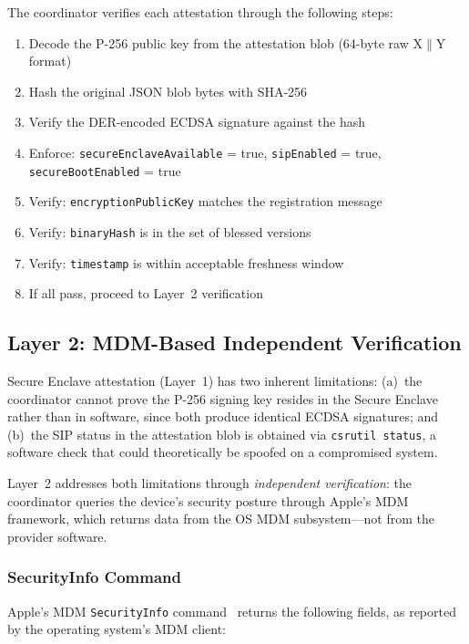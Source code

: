 \documentclass[10pt,twocolumn,letterpaper]{article}
\begin{document}
The coordinator verifies each attestation through the following steps:
\begin{enumerate}[leftmargin=*,itemsep=1pt]
    \item Decode the P-256 public key from the attestation blob (64-byte raw X$\|$Y format)
    \item Hash the original JSON blob bytes with SHA-256
    \item Verify the DER-encoded ECDSA signature against the hash
    \item Enforce: \texttt{secureEnclaveAvailable} = true, \texttt{sipEnabled} = true, \texttt{secureBootEnabled} = true
    \item Verify: \texttt{encryptionPublicKey} matches the registration message
    \item Verify: \texttt{binaryHash} is in the set of blessed versions
    \item Verify: \texttt{timestamp} is within acceptable freshness window
    \item If all pass, proceed to Layer~2 verification
\end{enumerate}

\subsection{Layer 2: MDM-Based Independent Verification}
\label{sec:mdm}

Secure Enclave attestation (Layer~1) has two inherent limitations: (a)~the coordinator cannot prove the P-256 signing key resides in the Secure Enclave rather than in software, since both produce identical ECDSA signatures; and (b)~the SIP status in the attestation blob is obtained via \texttt{csrutil status}, a software check that could theoretically be spoofed on a compromised system.

Layer~2 addresses both limitations through \emph{independent verification}: the coordinator queries the device's security posture through Apple's MDM framework, which returns data from the OS MDM subsystem---not from the provider software.

\subsubsection{SecurityInfo Command}

Apple's MDM \texttt{SecurityInfo} command~\cite{apple-mdm} returns the following fields, as reported by the operating system's MDM client:
\end{document}
